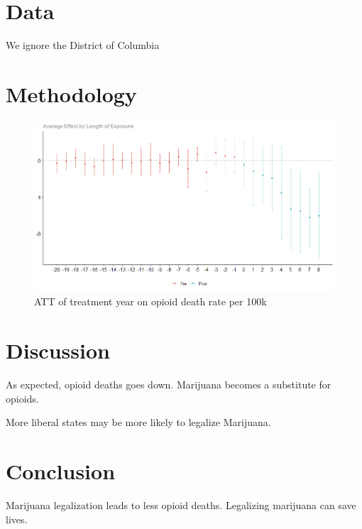 \documentclass{article}
\begin{document}

\section*{Data} %

We ignore the District of Columbia






\section*{Methodology} %



\begin{figure}
    \begin{center}
        \includegraphics[width=.85\textwidth]{sc_graph.png}
    \end{center}
    \caption{ATT of treatment year on opioid death rate per 100k}
    \label{fig:graph}
\end{figure}



\section*{Discussion}

As expected, opioid deaths goes down. Marijuana becomes a substitute for opioids. 

More liberal states may be more likely to legalize Marijuana.


\section*{Conclusion}

Marijuana legalization leads to less opioid deaths. Legalizing marijuana can save lives. 


\end{document}

